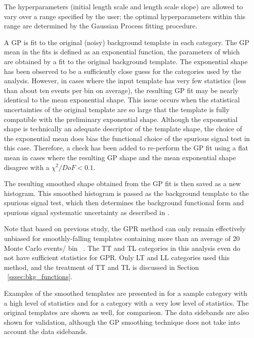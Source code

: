 The hyperparameters (initial length scale and length scale slope) are allowed to vary over a range specified by the user; the optimal hyperparameters within this range are determined by the Gaussian Process fitting procedure.

A GP is fit to the original (noisy) background template in each category. The GP mean in the fits is defined as an exponential function,
the parameters of which are obtained by a fit to the original background template. The exponential
shape has been observed to be a sufficiently close guess for the categories used by the analysis.
However, in cases where the input template has very few statistics (less than about ten events per
bin on average), the resulting GP fit may be nearly identical to the mean exponential shape. This
issue occurs when the statistical uncertainties of the original template are so large that the template
is fully compatible with the preliminary exponential shape. Although the exponential shape
is technically an adequate descriptor of the template shape, the choice of the exponential mean
does bias the functional choice of the spurious signal test in this case. Therefore, a check has been
added to re-perform the GP fit using a flat mean in cases where the resulting GP shape and the
mean exponential shape disagree with a $\chi^2/DoF < 0.1$.

The resulting smoothed shape obtained from the GP fit is then saved as a new histogram. This
smoothed histogram is passed as the background template to the spurious signal test, which then
determines the background functional form and spurious signal systematic uncertainty as described
in \Sect{\ref{ssec:spurious_signal}}.

Note that based on previous study, the GPR method can only remain effectively unbiased for smoothly-falling templates containing more than an average of 20 Monte Carlo events/ bin ~\cite{HyyCoupling_140ifb}. 
The TT and TL categories in this analysis even do not have sufficient statistics for GPR. Only LT and LL categories used this method, and the treatment of TT and TL is discussed in Section ~\ref{sssec:bkg_functions}. 

Examples of the smoothed templates are presented in \Fig{\ref{fig:exampleGPR}} for a sample category with a high
level of statistics and for a category with a very low level of statistics.
The original templates are shown as well, for comparison. The data sidebands are also shown for
validation, although the GP smoothing technique does not take into account the data sidebands.

